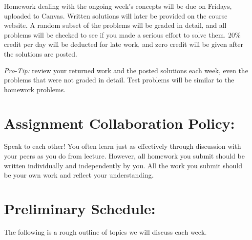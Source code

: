 \documentclass[margin,line]{res}
\begin{document}
\begin{resume}
Homework dealing with the ongoing week's concepts will be due on Fridays, uploaded to Canvas.
Written solutions will later be provided on the course website.
A random subset of the problems will be graded in detail, and all problems will be checked to see if you made a serious effort to solve them.
20\% credit per day will be deducted for late work, and zero credit will be given after the solutions are posted.

\textit{Pro-Tip:} review your returned work and the posted solutions each week, even the problems that were not graded in detail. Test problems will be similar to the homework problems.



\section{Assignment Collaboration Policy:} 

Speak to each other!
You often learn just as effectively through discussion with your peers as you do from lecture. 
However, all homework you submit should be written individually and independently by you.
All the work you submit should be your own work and reflect your understanding.

\clearpage

\section{Preliminary Schedule:}

%
%

%
%


The following is a rough outline of topics we will discuss each week. 


\end{resume}
\end{document}
